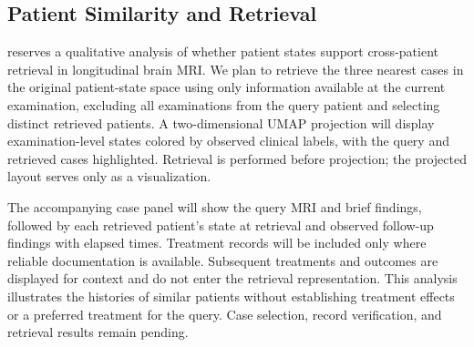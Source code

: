 

\subsection{Patient Similarity and Retrieval}
\label{sec:patient_similarity}

 reserves a qualitative analysis of
whether patient states support cross-patient retrieval in longitudinal brain
MRI. We plan to retrieve the three nearest cases in the original patient-state
space using only information available at the current examination, excluding
all examinations from the query patient and selecting distinct retrieved
patients. A two-dimensional UMAP projection will display examination-level
states colored by observed clinical labels, with the query and retrieved cases
highlighted. Retrieval is performed before projection; the projected layout
serves only as a visualization.

The accompanying case panel will show the query MRI and brief findings,
followed by each retrieved patient's state at retrieval and observed follow-up
findings with elapsed times. Treatment records will be included only where
reliable documentation is available. Subsequent treatments and outcomes are
displayed for context and do not enter the retrieval representation. This
analysis illustrates the histories of similar patients without establishing
treatment effects or a preferred treatment for the query. Case selection,
record verification, and retrieval results remain pending.


